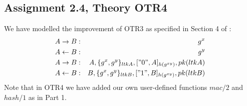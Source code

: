 \documentclass[a4paper]{article}
\begin{document}
\subsection{Assignment 2.4, Theory OTR4}
We have modelled the improvement of OTR3 as specified in Section 4 of \cite{1}:
\begin{eqnarray*}
A \to B            & : & {g^x}\\
A \leftarrow B & : & {g^y}\\
A \to B            & : & A, \{{g^x}, {g^y}\}_{ltkA}, ["0", A]_{h(g^{xy})}, {pk(ltkA)}\\
A \leftarrow B & : & B, \{{g^x}, {g^y}\}_{ltkB}, ["1", B]_{h(g^{xy})}, {pk(ltkB)}
\end{eqnarray*}
Note that in OTR4 we have added our own user-defined functions $mac/2$ and $hash/1$ as in Part 1.
\end{document}
